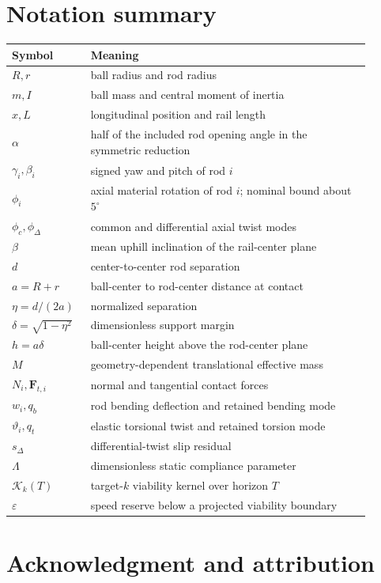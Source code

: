 \documentclass[11pt]{article}
\numberwithin{equation}{section}
\theoremstyle{definition}
\theoremstyle{remark}
\newcommand{\K}{\mathcal{K}}
\begin{document}
\section{Notation summary}

\begin{longtable}{@{}p{0.18\linewidth}p{0.72\linewidth}@{}}
\toprule
Symbol & Meaning \\
\midrule
$R,r$ & ball radius and rod radius \\
$m,I$ & ball mass and central moment of inertia \\
$x,L$ & longitudinal position and rail length \\
$\alpha$ & half of the included rod opening angle in the symmetric reduction \\
$\gamma_i,\beta_i$ & signed yaw and pitch of rod $i$ \\
$\phi_i$ & axial material rotation of rod $i$; nominal bound about $5^\circ$ \\
$\phi_c,\phi_\Delta$ & common and differential axial twist modes \\
$\beta$ & mean uphill inclination of the rail-center plane \\
$d$ & center-to-center rod separation \\
$a=R+r$ & ball-center to rod-center distance at contact \\
$\eta=d/(2a)$ & normalized separation \\
$\delta=\sqrt{1-\eta^2}$ & dimensionless support margin \\
$h=a\delta$ & ball-center height above the rod-center plane \\
$M$ & geometry-dependent translational effective mass \\
$N_i,\bm F_{t,i}$ & normal and tangential contact forces \\
$w_i,q_b$ & rod bending deflection and retained bending mode \\
$\vartheta_i,q_t$ & elastic torsional twist and retained torsion mode \\
$s_\Delta$ & differential-twist slip residual \\
$\Lambda$ & dimensionless static compliance parameter \\
$\K_k(T)$ & target-$k$ viability kernel over horizon $T$ \\
$\varepsilon$ & speed reserve below a projected viability boundary \\
\bottomrule
\end{longtable}


\section*{Acknowledgment and attribution}
\end{document}

